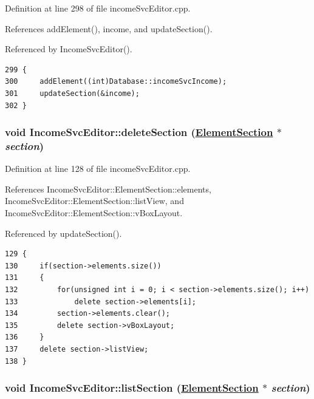 Definition at line 298 of file income\-Svc\-Editor.cpp.

References add\-Element(), income, and update\-Section().

Referenced by Income\-Svc\-Editor().

\footnotesize\begin{verbatim}299 {
300     addElement((int)Database::incomeSvcIncome);
301     updateSection(&income);
302 }
\end{verbatim}\normalsize 


\hypertarget{classIncomeSvcEditor_d1}{
\subsubsection[deleteSection]{\setlength{\rightskip}{0pt plus 5cm}void Income\-Svc\-Editor::delete\-Section (\hyperlink{structIncomeSvcEditor_1_1ElementSection}{Element\-Section} $\ast$ {\em section})}}
\label{classIncomeSvcEditor_d1}


Definition at line 128 of file income\-Svc\-Editor.cpp.

References Income\-Svc\-Editor::Element\-Section::elements, Income\-Svc\-Editor::Element\-Section::list\-View, and Income\-Svc\-Editor::Element\-Section::v\-Box\-Layout.

Referenced by update\-Section().

\footnotesize\begin{verbatim}129 {
130     if(section->elements.size())
131     {
132         for(unsigned int i = 0; i < section->elements.size(); i++)
133             delete section->elements[i];
134         section->elements.clear();
135         delete section->vBoxLayout;
136     }
137     delete section->listView;
138 }
\end{verbatim}\normalsize 


\hypertarget{classIncomeSvcEditor_d0}{
\subsubsection[listSection]{\setlength{\rightskip}{0pt plus 5cm}void Income\-Svc\-Editor::list\-Section (\hyperlink{structIncomeSvcEditor_1_1ElementSection}{Element\-Section} $\ast$ {\em section})}}
\label{classIncomeSvcEditor_d0}


